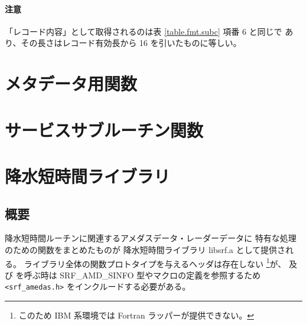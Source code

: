 \paragraph{注意}
「レコード内容」として取得されるのは表 \ref{table.fmt.subc} 項番 6 と同じで
あり、その長さはレコード有効長から 16 を引いたものに等しい。



\clearpage
\section{メタデータ用関数}
















\clearpage
\section{サービスサブルーチン関数}
\label{capi:service}

























\clearpage
\section{降水短時間ライブラリ}
\label{capi:libsrf}

\subsection{概要}

降水短時間ルーチンに関連するアメダスデータ・レーダーデータに
特有な処理のための関数をまとめたものが
降水短時間ライブラリ libsrf.a として提供される。
ライブラリ全体の関数プロトタイプを与えるヘッダは存在しない%
\footnote{このため IBM 系環境では Fortran ラッパーが提供できない。}が、
 及び
 を呼ぶ時は
SRF\_AMD\_SINFO 型やマクロの定義を参照するため
\verb|<srf_amedas.h>| をインクルードする必要がある。









